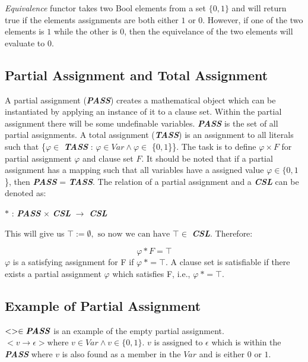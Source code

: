 \documentclass[11pt,a4paper, notitlepage]{report}
\begin{document}
\emph{Equivalence} functor takes two Bool elements from a set $\{0,1\}$ and will return true if the elements assignments are both either $1$ or $0$. However, if one of the two elements is $1$ while the other is $0$, then the equivelance of the two elements will evaluate to $0$.

\subsection {Partial Assignment and Total Assignment}
\label{sec:pata}

A partial assignment (\textbf{\textit{PASS}}) creates a mathematical object which can be instantiated by applying an instance of it to a clause set. Within the partial assignment there will be some undefinable variables. \textbf{\textit{PASS}} is the set of all partial assignments.
A total assignment (\textbf{\textit{TASS}}) is an assignment to all literals such that \{$\varphi \in$ \textbf{\textit{TASS}} : $\varphi \in Var \land \varphi \in$ \{$0,1$\}\}. The task is to define $\varphi \times F$ for partial assignment $\varphi$ and clause set $F$. It should be noted that if a partial assignment has a mapping such that all variables have a assigned value $\varphi \in \{0,1$\}, then \textbf{\textit{PASS}} = \textbf{\textit{TASS}}.
The relation of a partial assignment and a \textbf{\textit{CSL}} can be denoted as:

\begin{center}
$\ast$ : \textbf{\textit{PASS}} $\times$ \textbf{\textit{CSL}} $\rightarrow$ \textbf{\textit{CSL}}
\end{center}
This will give us $\top:= \emptyset, \text{ so now we can have } \top \in$ \textbf{\textit{CSL}}. Therefore:

\begin{displaymath}
\varphi \ast F = \top
\end{displaymath}
$\varphi$ is a satisfying assignment for F if $\varphi \: \ast = \top$. A clause set is satisfiable if there exists a partial assignment $\varphi$ which satisfies F, i.e., $\varphi \: \ast = \top$.

\subsection{Example of Partial Assignment}
\label{subsec:ExamplePA}

$<> \in \textbf{\textit{PASS}}$ is an example of the empty partial assignment.
$< v \rightarrow \epsilon > \text{where } v \in Var \land v \in \{0,1\}$. $v$ is assigned to $\epsilon$ which is within the \textbf{\textit{PASS}} where $v$ is also found as a member in the $Var$ and is either $0$ or $1$.
\end{document}
